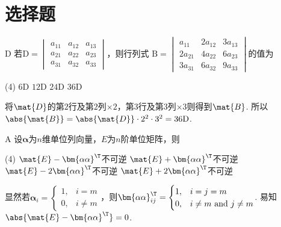 \section{选择题}
\begin{choice}{D}
    若$\mathrm{D}=\begin{vmatrix}
        a_{11} & a_{12} & a_{13}\\
        a_{21} & a_{22} & a_{23}\\
        a_{31} & a_{32} & a_{33}
    \end{vmatrix}$，则行列式
    $\mathrm{B}=\begin{vmatrix}
         a_{11} & 2a_{12} & 3a_{13}\\
        2a_{21} & 4a_{22} & 6a_{23}\\
        3a_{31} & 6a_{32} & 9a_{33}
    \end{vmatrix}$的值为
\begin{tasks}(4)
    \task $6\mathrm{D}$
    \task $12\mathrm{D}$
    \task $24\mathrm{D}$
    \task $36\mathrm{D}$
\end{tasks}
\end{choice}
\begin{solution}
    将$\mat{D}$的第$2$行及第$2$列$\times 2$，第$3$行及第$3$列$\times 3$则得到$\mat{B}$. 所以$\abs{\mat{B}}=\abs{\mat{D}}\cdot 2^2\cdot 3^2=36\mathrm{D}$. 
\end{solution}

\begin{choice}{A}
    设$\bm{\alpha}$为$n$维单位列向量，$E$为$n$阶单位矩阵，则
\begin{tasks}(4)
    \task $\mat{E}-\bm{\alpha\alpha}^\T$不可逆
    \task $\mat{E}+\bm{\alpha\alpha}^\T$不可逆
    \task $\mat{E}-2\bm{\alpha\alpha}^\T$不可逆
    \task $\mat{E}+2\bm{\alpha\alpha}^\T$不可逆
\end{tasks}
\end{choice}
\begin{solution}
    显然若$\bm{\alpha}_i=\begin{cases}
        1, & i=m\\0, & i\neq m
    \end{cases}$，则$\bm{\alpha\alpha}^\T_{ij}=\begin{cases}
        1, & i=j=m\\0, & i\neq m \text{ and } j\neq m
    \end{cases}$. 易知$\abs{\mat{E}-\bm{\alpha\alpha}^\T}=0$. 
\end{solution}

